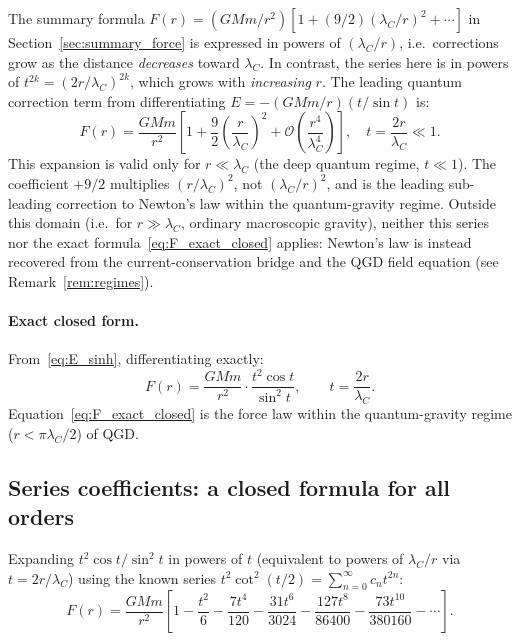 \documentclass[11pt,a4paper]{article}
\theoremstyle{definition}
\theoremstyle{remark}
\begin{document}
	\begin{tcolorbox}[enhanced,breakable,
	  colback=white,colframe=black,
	  title={\textbf{Note on the force law expansion coefficients}},
	  fonttitle=\bfseries]
	The summary formula $F(r) = (GMm/r^2)[1 + (9/2)(\lambda_C/r)^2 + \cdots]$ in
	Section~\ref{sec:summary_force} is expressed in powers of $(\lambda_C/r)$, i.e.\
	corrections grow as the distance \emph{decreases} toward $\lambda_C$.  In contrast,
	the series here is in powers of $t^{2k} = (2r/\lambda_C)^{2k}$, which grows with
	\emph{increasing} $r$.  The leading quantum correction term from differentiating
	$E = -(GMm/r)(t/\sin t)$ is:
	\begin{equation}
	  F(r) = \frac{GMm}{r^2}\left[1 + \frac{9}{2}\left(\frac{r}{\lambda_C}\right)^2
	         + \mathcal{O}\!\left(\frac{r^4}{\lambda_C^4}\right)\right],
	         \quad t = \frac{2r}{\lambda_C} \ll 1.
	\end{equation}
	This expansion is valid only for $r \ll \lambda_C$ (the deep quantum regime,
	$t \ll 1$).  The coefficient $+9/2$ multiplies $(r/\lambda_C)^2$, not
	$(\lambda_C/r)^2$, and is the leading sub-leading correction to Newton's law
	within the quantum-gravity regime.  Outside this domain (i.e.\ for
	$r \gg \lambda_C$, ordinary macroscopic gravity), neither this series nor the
	exact formula~\eqref{eq:F_exact_closed} applies: Newton's law is instead
	recovered from the current-conservation bridge and the QGD field equation
	(see Remark~\ref{rem:regimes}).
	\end{tcolorbox}

	\paragraph{Exact closed form.}
	From~\eqref{eq:E_sinh}, differentiating exactly:
	\begin{equation}
		\boxed{F(r) = \frac{GMm}{r^2}\cdot\frac{t^2\cos t}{\sin^2 t},
		\qquad t = \frac{2r}{\lambda_C}.}
		\label{eq:F_exact_closed}
	\end{equation}
	Equation~\eqref{eq:F_exact_closed} is the force law within the quantum-gravity regime ($r < \pi\lambda_C/2$) of QGD.

	\subsection{Series coefficients: a closed formula for all orders}

	Expanding $t^2\cos t/\sin^2 t$ in powers of $t$ (equivalent to powers of
	$\lambda_C/r$ via $t = 2r/\lambda_C$) using the known series
	$t^2\cot^2(t/2) = \sum_{n=0}^\infty c_n t^{2n}$:
	\begin{equation}
		F(r) = \frac{GMm}{r^2}\!\left[
		  1
		  - \frac{t^2}{6}
		  - \frac{7t^4}{120}
		  - \frac{31t^6}{3024}
		  - \frac{127t^8}{86400}
		  - \frac{73t^{10}}{380160}
		  - \cdots
		\right].
	\end{equation}
\end{document}
